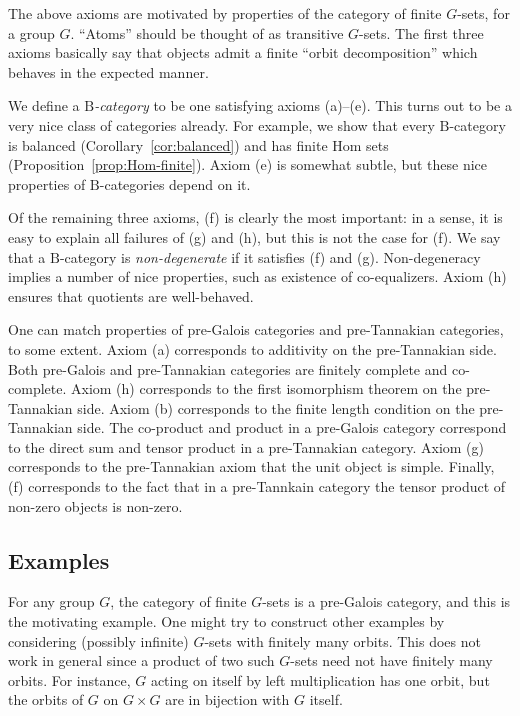 \documentclass[12pt]{amsart}
\numberwithin{equation}{section}
\theoremstyle{definition}
\newcommand{\rB}{\mathrm{B}}
\newcommand{\defn}[1]{\emph{#1}}
\begin{document}
The above axioms are motivated by properties of the category of finite $G$-sets, for a group $G$. ``Atoms'' should be thought of as transitive $G$-sets. The first three axioms basically say that objects admit a finite ``orbit decomposition'' which behaves in the expected manner.

We define a \defn{$\rB$-category} to be one satisfying axioms (a)--(e). This turns out to be a very nice class of categories already. For example, we show that every $\rB$-category is balanced (Corollary~\ref{cor:balanced}) and has finite Hom sets (Proposition~\ref{prop:Hom-finite}). Axiom (e) is somewhat subtle, but these nice properties of $\rB$-categories depend on it.

Of the remaining three axioms, (f) is clearly the most important: in a sense, it is easy to explain all failures of (g) and (h), but this is not the case for (f). We say that a $\rB$-category is \defn{non-degenerate} if it satisfies (f) and (g). Non-degeneracy implies a number of nice properties, such as existence of co-equalizers. Axiom (h) ensures that quotients are well-behaved.

One can match properties of pre-Galois categories and pre-Tannakian categories, to some extent. Axiom (a) corresponds to additivity on the pre-Tannakian side. Both pre-Galois and pre-Tannakian categories are finitely complete and co-complete. Axiom (h) corresponds to the first isomorphism theorem on the pre-Tannakian side.  Axiom (b) corresponds to the finite length condition on the pre-Tannakian side. The co-product and product in a pre-Galois category correspond to the direct sum and tensor product in a pre-Tannakian category. Axiom (g) corresponds to the pre-Tannakian axiom that the unit object is simple. Finally, (f) corresponds to the fact that in a pre-Tannkain category the tensor product of non-zero objects is non-zero.

\subsection{Examples}

For any group $G$, the category of finite $G$-sets is a pre-Galois category, and this is the motivating example. One might try to construct other examples by considering (possibly infinite) $G$-sets with finitely many orbits. This does not work in general since a product of two such $G$-sets need not have finitely many orbits. For instance, $G$ acting on itself by left multiplication has one orbit, but the orbits of $G$ on $G \times G$ are in bijection with $G$ itself.
\end{document}
